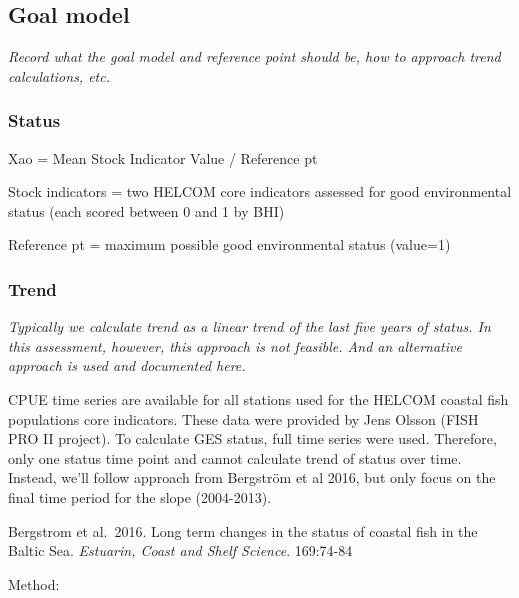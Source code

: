 \documentclass[
]{article}
\begin{document}
\hypertarget{goal-model}{%
\subsection{Goal model}\label{goal-model}}

\emph{Record what the goal model and reference point should be, how to
approach trend calculations, etc.}

\hypertarget{status}{%
\subsubsection{Status}\label{status}}

Xao = Mean Stock Indicator Value / Reference pt

Stock indicators = two HELCOM core indicators assessed for good
environmental status (each scored between 0 and 1 by BHI)

Reference pt = maximum possible good environmental status (value=1)

\hypertarget{trend}{%
\subsubsection{Trend}\label{trend}}

\emph{Typically we calculate trend as a linear trend of the last five
years of status. In this assessment, however, this approach is not
feasible. And an alternative approach is used and documented here.}

CPUE time series are available for all stations used for the HELCOM
coastal fish populations core indicators. These data were provided by
Jens Olsson (FISH PRO II project). To calculate GES status, full time
series were used. Therefore, only one status time point and cannot
calculate trend of status over time. Instead, we'll follow approach from
Bergström et al 2016, but only focus on the final time period for the
slope (2004-2013).

Bergstrom et al.~2016. Long term changes in the status of coastal fish
in the Baltic Sea. \emph{Estuarin, Coast and Shelf Science}. 169:74-84

Method:
\end{document}
